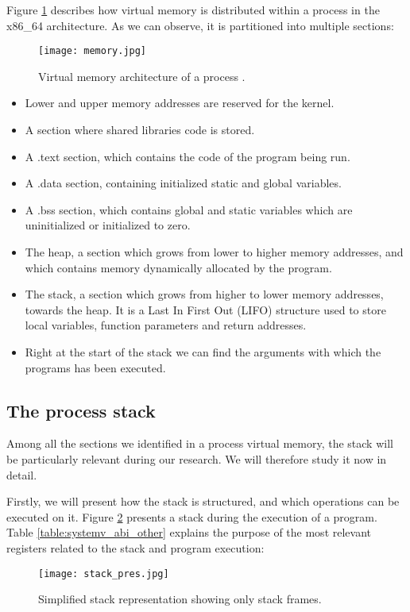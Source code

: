 Figure \ref{fig:mem_proc_arch} describes how virtual memory is distributed within a process in the x86\_64 architecture. As we can observe, it is partitioned into multiple sections:
\begin{figure}[htbp]
	\centering
	\texttt{[image: memory.jpg]}
	\caption{Virtual memory architecture of a process \cite{mem_arch_proc}.}
	\label{fig:mem_proc_arch}
\end{figure}
\begin{itemize}
\item Lower and upper memory addresses are reserved for the kernel.
\item A section where shared libraries code is stored.
\item A .text section, which contains the code of the program being run.
\item A .data section, containing initialized static and global variables.
\item A .bss section, which contains global and static variables which are uninitialized or initialized to zero.
\item The heap, a section which grows from lower to higher memory addresses, and which contains memory dynamically allocated by the program.
\item The stack, a section which grows from higher to lower memory addresses, towards the heap. It is a Last In First Out (LIFO) structure used to store local variables, function parameters and return addresses.
\item Right at the start of the stack we can find the arguments with which the programs has been executed.
\end{itemize}

\subsection{The process stack} \label{subsection:stack}
Among all the sections we identified in a process virtual memory, the stack will be particularly relevant during our research. We will therefore study it now in detail. 

Firstly, we will present how the stack is structured, and which operations can be executed on it. Figure \ref{fig:stack_pres} presents a stack during the execution of a program. Table \ref{table:systemv_abi_other} explains the purpose of the most relevant registers related to the stack and program execution:

\begin{figure}[htbp]
	\centering
	\texttt{[image: stack\_pres.jpg]}
	\caption{Simplified stack representation showing only stack frames.}
	\label{fig:stack_pres}
\end{figure}

